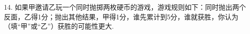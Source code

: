 14.	如果甲邀请乙玩一个同时抛掷两枚硬币的游戏，游戏规则如下：同时抛出两个反面，乙得1分；抛出其他结果，甲得1分，谁先累计到5分，谁就获胜，你认为\key{\hspace{1cm}}（填“甲”或“乙”）获胜的可能性更大.



